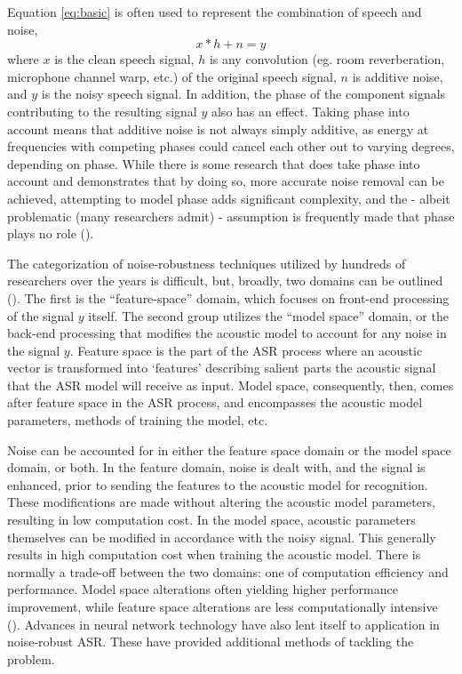 \documentclass[dissertation,copyright]{uathesis}
\begin{document}
Equation \ref{eq:basic} is often used to represent the combination of speech and noise,
\begin{equation}\label{eq:basic}
x * h + n = y
\end{equation}
where $x$ is the clean speech signal, $h$ is any convolution (eg. room reverberation, microphone channel warp, etc.) of the original speech signal, $n$ is additive noise, and $y$ is the noisy speech signal.  In addition, the phase of the component signals contributing to the resulting signal $y$ also has an effect.  Taking phase into account means that additive noise is not always simply additive, as energy at frequencies with competing phases could cancel each other out to varying degrees, depending on phase.  While there is some research that does take phase into account and demonstrates that by doing so, more accurate noise removal can be achieved, attempting to model phase adds significant complexity, and the - albeit problematic (many researchers admit) - assumption is frequently made that phase plays no role (\cite{li:14}).  


The categorization of noise-robustness techniques utilized by hundreds of researchers over the years is difficult, but, broadly, two domains can be outlined (\cite{li:14,zhang:17}).  The first is the ``feature-space'' domain, which focuses on front-end processing of the signal $y$ itself.  The second group utilizes the ``model space'' domain, or the back-end processing that modifies the acoustic model to account for any noise in the signal $y$.  Feature space is the part of the ASR process where an acoustic vector is transformed into `features' describing salient parts the acoustic signal that the ASR model will receive as input.  Model space, consequently, then, comes after feature space in the ASR process, and encompasses the acoustic model parameters, methods of training the model, etc.  

Noise can be accounted for in either the feature space domain or the model space domain, or both.  In the feature domain, noise is dealt with, and the signal is enhanced, prior to sending the features to the acoustic model for recognition.  These modifications are made without altering the acoustic model parameters, resulting in low computation cost.  In the model space, acoustic parameters themselves can be modified in accordance with the noisy signal.  This generally results in high computation cost when training the acoustic model.  There is normally a trade-off between the two domains: one of computation efficiency and performance. Model space alterations often yielding higher performance improvement, while feature space alterations are less computationally intensive (\cite{li:14}).
Advances in neural network technology have also lent itself to application in noise-robust ASR.  These have provided additional methods of tackling the problem.
\end{document}

